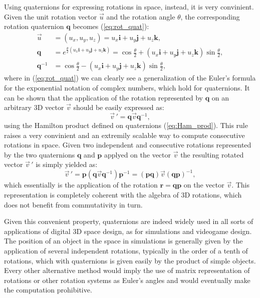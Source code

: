 Using quaternions for expressing rotations in space, instead, it is very convinient. Given the unit rotation vector $\vec u$ and the rotation angle $\theta$, the corresponding rotation quaternion $\bm{q}$ becomes (\ref{eq:rot_quat}):
\begin{align}
    \vec u & = (u_x, u_y, u_z) = u_x\bm{i} + u_y\bm{j} + u_z\bm{k}, \\
    \bm{q} & = e^{\frac{\theta}{2}(u_x\bm{i} + u_y\bm{j} + u_z\bm{k})} = \cos{\frac{\theta}{2}} + (u_x\bm{i} + u_y\bm{j} + u_z\bm{k})\sin{\frac{\theta}{2}}, \label{eq:rot_quat}\\
    \bm{q}^{-1} & = \cos{\frac{\theta}{2}} - (u_x\bm{i} + u_y\bm{j} + u_z\bm{k})\sin{\frac{\theta}{2}},
\end{align}
where in (\ref{eq:rot_quat}) we can clearly see a generalization of the Euler's formula for the exponential notation of complex numbers, which hold for quaternions. It can be shown that the application of the rotation represented by $\bm{q}$ on an arbitrary 3D vector $\vec v$ should be easily expressed as:
\begin{equation}
    \vec v\,' = \bm{q} \vec v \bm{q}^{-1},
\end{equation}
using the Hamilton product defined on quaternions (\ref{eq:Ham_prod}). This rule raises a very convinient and an extremily scalable way to compute consecutive rotations in space. Given two independent and consecutive rotations represented by the two quaternions $\bm{q}$ and $\bm{p}$ applyed on the vector $\vec v$ the resulting rotated vector $\vec v\,'$ is simply yielded as:
\begin{equation}
    \vec v\,' = \bm{p} ( \bm{q} \vec v \bm{q}^{-1} ) \bm{p}^{-1} = (\bm{p}\bm{q}) \vec v (\bm{q}\bm{p})^{-1},
\end{equation}
which essentially is the application of the rotation $\bm{r} = \bm{q}\bm{p}$ on the vector $\vec v$. This representation is completely coherent with the algebra of 3D rotations, which does not benefit from commutativity in turn.

Given this convenient property, quaternions are indeed widely used in all sorts of applications of digital 3D space design, as for simulations and videogame design. The position of an object in the space in simulations is generally given by the application of several independent rotations, typically in the order of a tenth of rotations, which with quaternions is given easily by the product of simple objects. Every other alternative method would imply the use of matrix representation of rotations or other rotation systems as Euler's angles and would eventually make the computation prohibitive.

